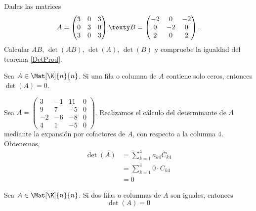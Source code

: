 \documentclass[compacto,10pt]{pubciencias-notas}
\begin{document}
\begin{ejer}\hspace{0pt} Dadas las matrices
\[
A = 
    \begin{pmatrix}
        3 & 0 & 3 \\
        0 & 3 & 0 \\
        3 & 0 & 3
    \end{pmatrix}
\texty    
B = 
    \begin{pmatrix}
        -2 & 0 & -2 \\
        0 & -2 & 0 \\
        2 & 0 & 2
    \end{pmatrix}.
\]
Calcular $AB$, $\det(AB)$, $\det(A)$, $\det(B)$ y compruebe la igualdad del teorema \ref{DetProd}.
\end{ejer}

\begin{prop}
    Sea $A \in \Mat[\K]{n}{n}$. Si una fila o columna de $A$ contiene solo ceros, entonces $\det (A) =0$.
\end{prop}

\begin{ejem}
    Sea $A =
    \begin{pmatrix}
        3 & -1 & 11 & 0 \\
        9 & 7 & -5 & 0 \\
        -2 & -6 & -8 & 0 \\
        4 & 1 & -5 & 0
    \end{pmatrix}$. Realizamos el cálculo del determinante de $A$ mediante la expansión por cofactores de $A$, con respecto a la columna $4$. Obtenemos,
    \begin{align*}
        \det(A) &= \sum_{k=1}^{4} a_{k4} C_{k4}\\
                &= \sum_{k=1}^{4} 0\cdot C_{k4}\\
                &= 0
    \end{align*}
    
\end{ejem}

\begin{prop}
    Sea $A \in \Mat[\K]{n}{n}$. Si dos filas o columnas de $A$ son iguales, entonces 
    \[
        \det(A) = 0
    \]
\end{prop}
\end{document}
